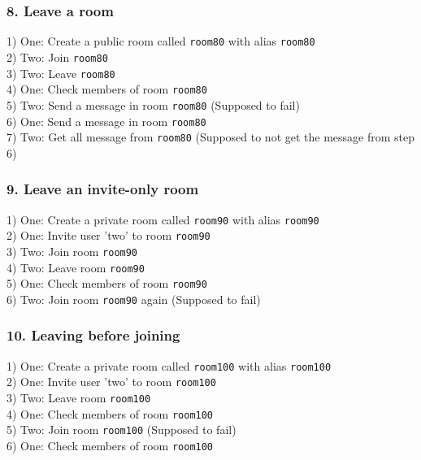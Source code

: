 \documentclass{article}
\begin{document}
\subsubsection*{8. Leave a room}
1) One: Create a public room called \texttt{room80} with alias \texttt{room80} \\
2) Two: Join \texttt{room80} \\
3) Two: Leave \texttt{room80} \\
4) One: Check members of room \texttt{room80} \\
5) Two: Send a message in room \texttt{room80} (Supposed to fail) \\
6) One: Send a message in room \texttt{room80} \\
7) Two: Get all message from \texttt{room80} (Supposed to not get the message from step 6) 

\subsubsection*{9. Leave an invite-only room}
1) One: Create a private room called \texttt{room90} with alias \texttt{room90} \\
2) One: Invite user 'two' to room \texttt{room90} \\
3) Two: Join room \texttt{room90} \\
4) Two: Leave room \texttt{room90} \\
5) One: Check members of room \texttt{room90} \\
6) Two: Join room \texttt{room90} again (Supposed to fail)

\subsubsection*{10. Leaving before joining}
1) One: Create a private room called \texttt{room100} with alias \texttt{room100} \\
2) One: Invite user 'two' to room \texttt{room100} \\
3) Two: Leave room \texttt{room100} \\
4) One: Check members of room \texttt{room100} \\
5) Two: Join room \texttt{room100} (Supposed to fail) \\
6) One: Check members of room \texttt{room100} 
\end{document}
